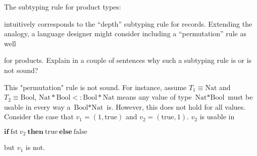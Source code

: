 \documentclass[12pt]{article}
\newenvironment{problem}[2][Problem]{\begin{trivlist}
\item[\hskip \labelsep {\bfseries #1}\hskip \labelsep {\bfseries #2.}]}{\end{trivlist}}
\begin{document}
\begin{problem}{5 (2 points)}
  The subtyping rule for product types:

  { }

\noindent intuitively corresponds to the ``depth'' subtyping rule for
  records. Extending the analogy, a language designer might consider
  including a ``permutation'' rule as well


\noindent for products. Explain in a couple of sentences why such a subtyping
  rule is or is not sound?
  
  This "permutation" rule is not sound. For instance, assume $T_1 \equiv \text{Nat}$ and $T_2 \equiv \text{Bool}$, $\text{Nat} * \text{Bool} <: \text{Bool} * \text{Nat}$ means any value of type $\text{Nat} * \text{Bool}$ must be usable in every way a $\text{Bool} * \text{Nat}$ is. However, this does not hold for all values. Consider the case that $v_1 = (1, \text{true})$ and $v_2 = (\text{true}, 1)$. $v_2$ is usable in
  
  \begin{center}
    $\textbf{if} ~\text{fst}~ v_2 ~\textbf{then}~ \text{true} ~\textbf{else}~ \text{false}$
  \end{center}
  
\noindent but $v_1$ is not.
\end{problem}
\end{document}
